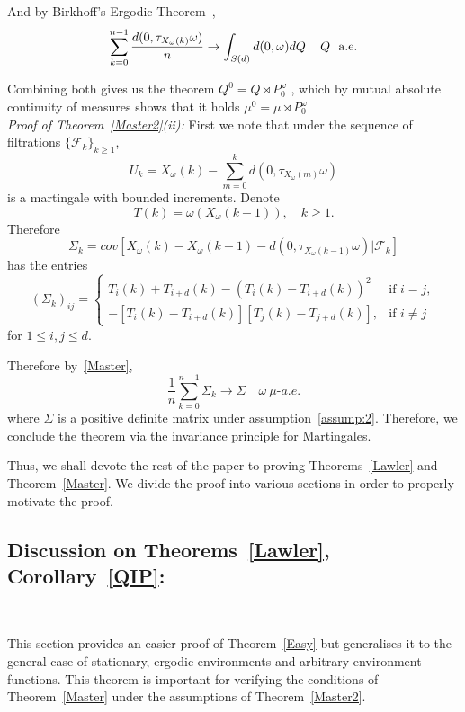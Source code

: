 \documentclass[final]{aomart}
\def\mathscr#1{#1}%
\def\mathbb#1{#1}%
\theoremstyle{plain}
\theoremstyle{definition}
\theoremstyle{remark}
\begin{document}
And by Birkhoff's Ergodic Theorem~\cite{birkhoff1931proof}, 
\[
\sum_{k=0}^{n-1}\frac{d(0,\tau_{X_\omega(k)}\omega)}{n} \to   \int_{\mathscr{S}(d)} d(0,{\omega})d\mathbb{Q} \hspace{0.5em} \ \ \mathbb{Q}\ \ \text{a.e.}
\]

Combining both gives us the theorem $\mathbb{Q}^0= \mathbb{Q}\rtimes  \mathbb{P}_{0}^{\omega}$ , which by mutual absolute continuity of measures shows that it holds $\mu^0= \mu\rtimes \mathbb{P}_{0}^{\omega}$ \\

\textit{Proof of Theorem~\ref{Master2}(ii):}
 First we note that under the sequence of filtrations $\{\mathcal{F}_k\}_{k \geq 1}$, \[
U_k = X_\omega(k) - \sum_{m=0}^{k} d(0, \tau_{X_{\omega}(m)} \omega)
\]
is a martingale with bounded increments. Denote \[
T(k) = \omega(X_{\omega}(k-1)),\quad k\geq1. 
\]
Therefore \[
\Sigma_k = cov[ X_{\omega}(k) - X_{\omega}(k-1)- d(0,\tau_{X_{\omega}(k-1)} \omega)| \mathcal{F}_k]
\]
has the entries \[
(\Sigma_k)_{ij} = \begin{cases}
T_i(k) + T_{i+d}(k) - (T_i(k) -T_{i+d}(k))^2 & \text{if } i=j,\\
-[T_i(k) -T_{i+d}(k)][T_j(k) -T_{j+d}(k)], & \text{if } i \neq j
\end{cases}
\]
for $1\leq i,j \leq d$. 

Therefore by~\ref{Master}, \[
\frac{1}{n} \sum_{k=0}^{n-1} \Sigma_k \to \Sigma \quad \omega~\mu\textit{-a.e.}
\]
where $\Sigma$ is a positive definite matrix under assumption~\ref{assump:2}. Therefore, we conclude the theorem via the invariance principle for Martingales. 

Thus, we shall devote the rest of the paper to proving Theorems~\ref{Lawler} and Theorem~\ref{Master}. 
We divide the proof into various sections in order to properly motivate the proof.

\subsection{Discussion on Theorems~\ref{Lawler}, Corollary~\ref{QIP}:}~\label{balanced proof} 

This section provides an easier proof of Theorem~\ref{Easy} but generalises it to the general case of stationary, ergodic environments and arbitrary environment functions. This theorem is important for verifying the conditions of Theorem~\ref{Master} under the assumptions of Theorem~\ref{Master2}. 
 
\end{document}
